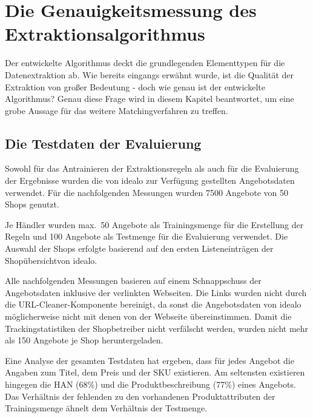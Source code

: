 \section{Die Genauigkeitsmessung des Extraktionsalgorithmus}
\label{sec:evaluierung}

Der entwickelte Algorithmus deckt die grundlegenden Elementtypen für die Datenextraktion ab.
Wie bereits eingangs erwähnt wurde, ist die Qualität der Extraktion von großer Bedeutung - doch wie genau ist der
entwickelte Algorithmus?
Genau diese Frage wird in diesem Kapitel beantwortet, um eine grobe Aussage für das weitere Matchingverfahren zu
treffen.

\subsection{Die Testdaten der Evaluierung}
\label{subsec:testdaten}
Sowohl für das Antrainieren der Extraktionsregeln als auch für die Evaluierung der Ergebnisse wurden die von idealo
zur Verfügung gestellten Angebotsdaten verwendet.
Für die nachfolgenden Messungen wurden 7500 Angebote von 50 Shops genutzt.

Je Händler wurden max.\ 50 Angebote als Trainingsmenge für die Erstellung der Regeln und 100 Angebote als Testmenge für
die Evaluierung verwendet.
Die Auswahl der Shops erfolgte basierend auf den ersten Listeneinträgen der Shopübersicht\footnotemark von idealo.

Alle nachfolgenden Messungen basieren auf einem Schnappschuss der Angebotsdaten inklusive der verlinkten Webseiten.
Die Links wurden nicht durch die URL-Cleaner-Komponente bereinigt, da sonst die Angebotsdaten von idealo
möglicherweise nicht mit denen von der Webseite übereinstimmen.
Damit die Trackingstatistiken der Shopbetreiber nicht verfälscht werden, wurden nicht mehr als 150 Angebote je Shop
heruntergeladen.

Eine Analyse der gesamten Testdaten hat ergeben, dass für jedes Angebot die Angaben zum Titel, dem Preis und der SKU
existieren.
Am seltensten existieren hingegen die HAN (68\%) und die Produktbeschreibung (77\%) eines Angebots.
Das Verhältnis der fehlenden zu den vorhandenen Produktattributen der Trainingsmenge ähnelt dem Verhältnis der
Testmenge.

